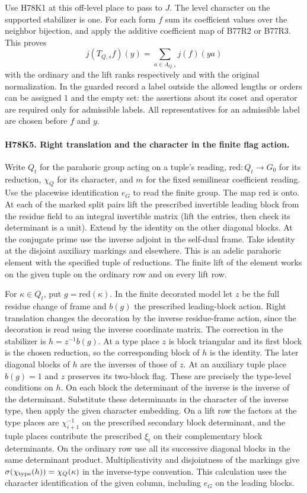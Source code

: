 Use H78K1 at this off-level place to pass to $J$. The level character
on the supported stabilizer is one. For each form $f$ sum
its coefficient values over the neighbor bijection, and apply the
additive coefficient map of B77R2 or B77R3. This proves
\[
  j(T_{Q,s}f)(y)=\sum_{a\in A_{Q,s}} j(f)(ya)
\]
with the ordinary and the lift ranks respectively and with the
original normalization. In the guarded record a label outside the
allowed lengths or orders can be assigned $1$ and the empty set:
the assertions about its coset and operator are required only for
admissible labels. All representatives for an admissible label
are chosen before $f$ and $y$.

\paragraph{H78K5. Right translation and the character in the finite flag action.}
Write $Q_t$ for the parahoric group acting on a tuple's reading,
$\mathrm{red}:Q_t\to G_0$ for its reduction, $\chi_Q$ for its
character, and $m$ for the fixed semilinear coefficient reading.
Use the placewise identification $e_G$ to read the finite group.
The map $\mathrm{red}$ is onto. At each of the marked split pairs
lift the prescribed invertible leading block from the residue field
to an integral invertible matrix (lift the entries, then check its
determinant is a unit). Extend by the identity on the other diagonal
blocks. At the conjugate prime use the inverse adjoint in the
self-dual frame. Take identity at the disjoint auxiliary markings
and elsewhere. This is an adelic parahoric element with the
specified tuple of reductions. The finite lift of the element works
on the given tuple on the ordinary row and on every lift row.

For $\kappa\in Q_t$, put $g=\mathrm{red}(\kappa)$. In the finite
decorated model let $z$ be the full residue change of frame and
$b(g)$ the prescribed leading-block action. Right translation
changes the decoration by the inverse residue-frame action, since
the decoration is read using the inverse coordinate matrix.
The correction in the stabilizer is $h=z^{-1}b(g)$.
At a type place $z$ is block triangular and its first block is the
chosen reduction, so the corresponding block of $h$ is the identity.
The later diagonal blocks of $h$ are the inverses of those of $z$.
At an auxiliary tuple place $b(g)=1$ and $z$ preserves its two-block
flag. These are precisely the type-level conditions on $h$.
On each block the determinant of the inverse is the inverse of the
determinant. Substitute these determinants in the character of the
inverse type, then apply the given character embedding. On a lift
row the factors at the type places are $\chi_{i+1}^{-1}$ on the
prescribed secondary block determinant, and the tuple places
contribute the prescribed $\xi_t$ on their complementary block
determinants. On the ordinary row use all its successive diagonal
blocks in the same determinant product. Multiplicativity and
disjointness of the markings give
$\sigma(\chi_{\rm type}(h))=\chi_Q(\kappa)$ in the inverse-type
convention. This calculation uses the character identification
of the given column, including $e_G$ on the leading blocks.


